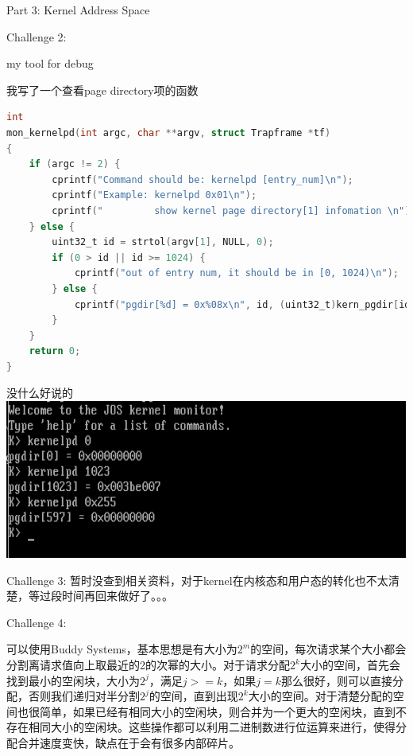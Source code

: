 \documentclass[GBK,winfonts,a4paper,10pt]{ctexart}
\begin{document}
\begin{section}{Part 3: Kernel Address Space}
\begin{subsection}{Challenge 2:}
\begin{subsubsection}{ my tool for debug }
\par
我写了一个查看page directory项的函数
\begin{lstlisting}[language=C]
int 
mon_kernelpd(int argc, char **argv, struct Trapframe *tf)
{
    if (argc != 2) {
        cprintf("Command should be: kernelpd [entry_num]\n");
        cprintf("Example: kernelpd 0x01\n");
        cprintf("         show kernel page directory[1] infomation \n");
    } else {
        uint32_t id = strtol(argv[1], NULL, 0);
        if (0 > id || id >= 1024) {
            cprintf("out of entry num, it should be in [0, 1024)\n");
        } else {
            cprintf("pgdir[%d] = 0x%08x\n", id, (uint32_t)kern_pgdir[id]);
        }
    }
    return 0;
}
\end{lstlisting}
\par
没什么好说的
\includegraphics[scale=0.5]{kernelpd.png}
\end{subsubsection}

\end{subsection}

\begin{subsection}{Challenge 3:}
暂时没查到相关资料，对于kernel在内核态和用户态的转化也不太清楚，等过段时间再回来做好了。。。
\end{subsection}

\begin{subsection}{Challenge 4:}
\par
可以使用Buddy Systems，基本思想是有大小为$2^m$的空间，每次请求某个大小都会分割离请求值向上取最近的2的次幂的大小。对于请求分配$2^k$大小的空间，首先会找到最小的空闲块，大小为$2^j$，满足$j>=k$，如果$j=k$那么很好，则可以直接分配，否则我们递归对半分割$2^j$的空间，直到出现$2^k$大小的空间。对于清楚分配的空间也很简单，如果已经有相同大小的空闲块，则合并为一个更大的空闲块，直到不存在相同大小的空闲块。这些操作都可以利用二进制数进行位运算来进行，使得分配合并速度变快，缺点在于会有很多内部碎片。
\end{subsection}

\end{section}
\end{document}
